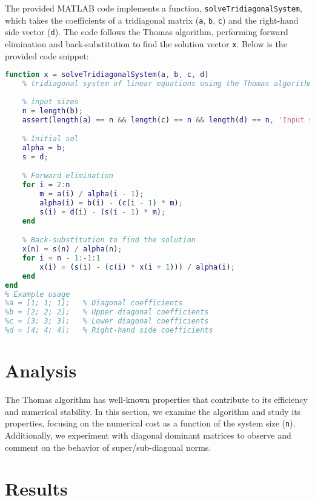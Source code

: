 The provided MATLAB code implements a function, \texttt{solveTridiagonalSystem}, which takes the coefficients of a tridiagonal matrix (\texttt{a}, \texttt{b}, \texttt{c}) and the right-hand side vector (\texttt{d}). The code follows the Thomas algorithm, performing forward elimination and back-substitution to find the solution vector \texttt{x}. Below is the provided code snippet:
\begin{center}
    \begin{lstlisting}[language=MATLAB, caption=Source Code]
        %%the start form here
function x = solveTridiagonalSystem(a, b, c, d)
    % tridiagonal system of linear equations using the Thomas algorithm
    
    % input sizes
    n = length(b);
    assert(length(a) == n && length(c) == n && length(d) == n, 'Input sizes mismatch');

    % Initial sol
    alpha = b;
    s = d;

    % Forward elimination
    for i = 2:n
        m = a(i) / alpha(i - 1);
        alpha(i) = b(i) - (c(i - 1) * m);
        s(i) = d(i) - (s(i - 1) * m);
    end

    % Back-substitution to find the solution
    x(n) = s(n) / alpha(n);
    for i = n - 1:-1:1
        x(i) = (s(i) - (c(i) * x(i + 1))) / alpha(i);
    end
end
% Example usage
%a = [1; 1; 1];   % Diagonal coefficients
%b = [2; 2; 2];   % Upper diagonal coefficients
%c = [3; 3; 3];   % Lower diagonal coefficients
%d = [4; 4; 4];   % Right-hand side coefficients

    \end{lstlisting}
\end{center}




\section*{Analysis}

The Thomas algorithm has well-known properties that contribute to its efficiency and numerical stability. In this section, we examine the algorithm and study its properties, focusing on the numerical cost as a function of the system size (\texttt{n}). Additionally, we experiment with diagonal dominant matrices to observe and comment on the behavior of super/sub-diagonal norms.

\section*{Results}

